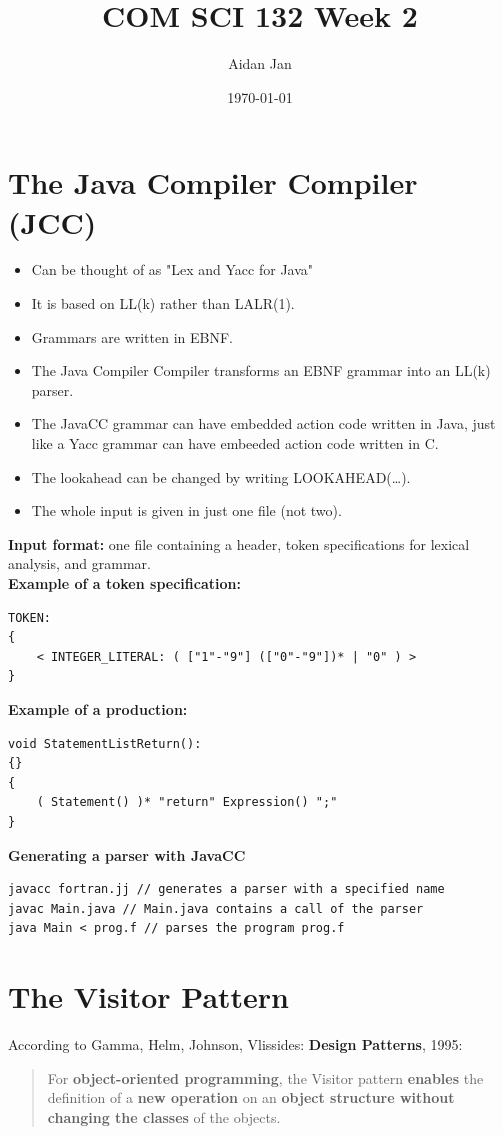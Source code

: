 \documentclass[10pt]{article}
\title{COM SCI 132 Week 2}
\author{Aidan Jan}
\date{\today}
\begin{document}
\maketitle
\section*{The Java Compiler Compiler (JCC)}
\begin{itemize}
    \item Can be thought of as "Lex and Yacc for Java"
    \item It is based on LL(k) rather than LALR(1).
    \item Grammars are written in EBNF.
    \item The Java Compiler Compiler transforms an EBNF grammar into an LL(k) parser.
    \item The JavaCC grammar can have embedded action code written in Java, just like a Yacc grammar can have embeeded action code written in C.
    \item The lookahead can be changed by writing LOOKAHEAD(\dots).
    \item The whole input is given in just one file (not two).
\end{itemize}
\textbf{Input format:} one file containing a header, token specifications for lexical analysis, and grammar.\\
\textbf{Example of a token specification:}
\begin{verbatim}
TOKEN:
{
    < INTEGER_LITERAL: ( ["1"-"9"] (["0"-"9"])* | "0" ) >
}
\end{verbatim}
\textbf{Example of a production:}
\begin{verbatim}
void StatementListReturn():
{}
{
    ( Statement() )* "return" Expression() ";"
}
\end{verbatim}
\textbf{Generating a parser with JavaCC}
\begin{verbatim}
javacc fortran.jj // generates a parser with a specified name
javac Main.java // Main.java contains a call of the parser
java Main < prog.f // parses the program prog.f    
\end{verbatim}

\section*{The Visitor Pattern}
According to Gamma, Helm, Johnson, Vlissides: \textbf{Design Patterns}, 1995:
\begin{quotation}
For \textbf{object-oriented programming}, the Visitor pattern \textbf{enables} the definition of a \textbf{new operation} on an \textbf{object structure without changing the classes} of the objects.
\end{quotation}
\end{document}
